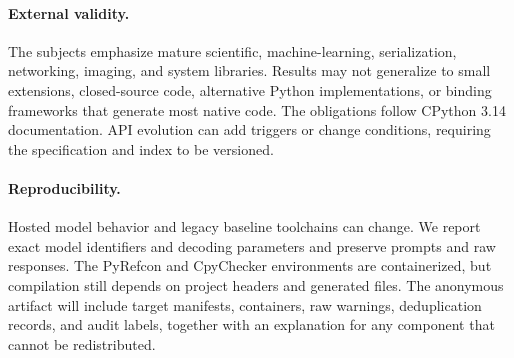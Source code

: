 \paragraph{External validity.}
The subjects emphasize mature scientific, machine-learning, serialization,
networking, imaging, and system libraries. Results may not generalize to small
extensions, closed-source code, alternative Python implementations, or binding
frameworks that generate most native code. The obligations follow CPython 3.14
documentation. API evolution can add triggers or change conditions, requiring
the specification and index to be versioned.

\paragraph{Reproducibility.}
Hosted model behavior and legacy baseline toolchains can change. We report
exact model identifiers and decoding parameters and preserve prompts and raw
responses. The PyRefcon and CpyChecker environments are containerized, but
compilation still depends on project headers and generated files. The
anonymous artifact will include target manifests, containers, raw warnings,
deduplication records, and audit labels, together with an explanation for any
component that cannot be redistributed.
